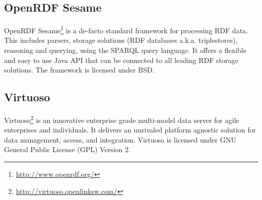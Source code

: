 \subsection{OpenRDF Sesame}
\label{sec:Sesame}
OpenRDF Sesame\footnote{\url{http://www.openrdf.org/}} is  a de-facto standard framework for processing RDF data. 
This includes parsers, storage solutions (RDF databases a.k.a. triplestores), reasoning and querying, using the SPARQL query language. 
It offers a flexible and easy to use Java API that can be connected to all leading RDF storage solutions. 
The framework is licensed under BSD.


\subsection{Virtuoso}
\label{sec:Virtuoso}
Virtuoso\footnote{\url{http://virtuoso.openlinksw.com/}} is an innovative enterprise grade multi-model data server for agile enterprises and individuals.
It delivers an unrivaled  platform agnostic solution for data management, access, and integration.
Virtuoso is licensed under GNU General Public License (GPL) Version 2.
